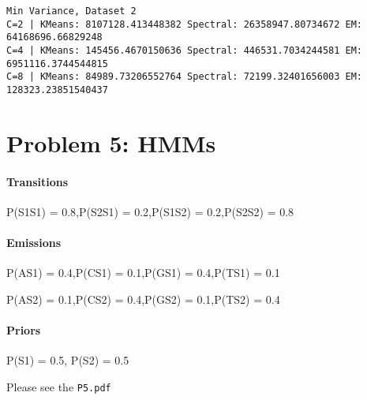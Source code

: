 \documentclass[11pt]{article}
\begin{document}
    \begin{Verbatim}[commandchars=\\\{\}]
Min Variance, Dataset 2
C=2 | KMeans: 8107128.413448382 Spectral: 26358947.80734672 EM: 64168696.66829248
C=4 | KMeans: 145456.4670150636 Spectral: 446531.7034244581 EM: 6951116.3744544815
C=8 | KMeans: 84989.73206552764 Spectral: 72199.32401656003 EM: 128323.23851540437

    \end{Verbatim}

    \hypertarget{problem-5-hmms}{%
\section{Problem 5: HMMs}\label{problem-5-hmms}}

    \hypertarget{transitions}{%
\paragraph{Transitions}\label{transitions}}

P(S1\textbar{}S1) = 0.8,P(S2\textbar{}S1) = 0.2,P(S1\textbar{}S2) =
0.2,P(S2\textbar{}S2) = 0.8

    \hypertarget{emissions}{%
\paragraph{Emissions}\label{emissions}}

P(A\textbar{}S1) = 0.4,P(C\textbar{}S1) = 0.1,P(G\textbar{}S1) =
0.4,P(T\textbar{}S1) = 0.1

P(A\textbar{}S2) = 0.1,P(C\textbar{}S2) = 0.4,P(G\textbar{}S2) =
0.1,P(T\textbar{}S2) = 0.4

    \hypertarget{priors}{%
\paragraph{Priors}\label{priors}}

P(S1) = 0.5, P(S2) = 0.5

    Please see the \texttt{P5.pdf}


    
    
    
    
\end{document}
